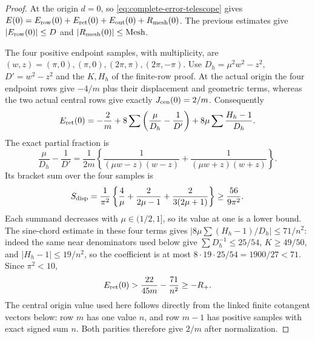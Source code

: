 \begin{proof}
At the origin $d=0$, so \eqref{eq:complete-error-telescope} gives
$E(0)=E_{\rm row}(0)+E_{\rm ret}(0)+E_{\rm out}(0)+R_{\rm mesh}(0)$.
The previous estimates give $|E_{\rm row}(0)|\leq D$ and
$|R_{\rm mesh}(0)|\leq\mathrm{Mesh}$.

The four positive endpoint samples, with multiplicity, are
$(w,z)=(\pi,0),(\pi,0),(2\pi,\pi),(2\pi,-\pi)$.
Use $D_h=\mu^2w^2-z^2$, $D'=w^2-z^2$ and the $K,H_h$ of the
finite-row proof. At the actual origin the four endpoint rows give
$-4/m$ plus their displacement and geometric terms, whereas the
two actual central rows give exactly $J_{\rm cen}(0)=2/m$.
Consequently
\[
 E_{\rm ret}(0)=-\frac2m
   +8\sum\left(\frac\mu{D_h}-\frac1{D'}\right)
   +8\mu\sum\frac{H_h-1}{D_h}.
\]
The exact partial fraction is
\[
 \frac\mu{D_h}-\frac1{D'}
 =\frac1{2m}\left\{\frac1{(\mu w-z)(w-z)}
                    +\frac1{(\mu w+z)(w+z)}\right\}.
\]
Its bracket sum over the four samples is
\[
 S_{\rm disp}=\frac1{\pi^2}
   \left\{\frac4\mu+\frac2{2\mu-1}+\frac2{3(2\mu+1)}\right\}
 \geq\frac{56}{9\pi^2}.
\]
Each summand decreases with $\mu\in(1/2,1]$, so its value at one
is a lower bound. The sine-chord estimate in these four terms gives
$|8\mu\sum(H_h-1)/D_h|\leq71/n^2$: indeed the same near
denominators used below give $\sum D_h^{-1}\leq25/54$,
$K\geq49/50$, and $|H_h-1|\leq19/n^2$, so the coefficient is
at most $8\cdot19\cdot25/54=1900/27<71$. Since $\pi^2<10$,
\begin{equation}\label{eq:retained-origin-gain}
 E_{\rm ret}(0)>\frac{22}{45m}-\frac{71}{n^2}\geq-R_+.
\end{equation}
The central origin value used here follows directly from the linked
finite cotangent vectors below: row $m$ has one value $n$, and row
$m-1$ has positive samples with exact signed sum $n$. Both parities
therefore give $2/m$ after normalization.


\end{proof}
